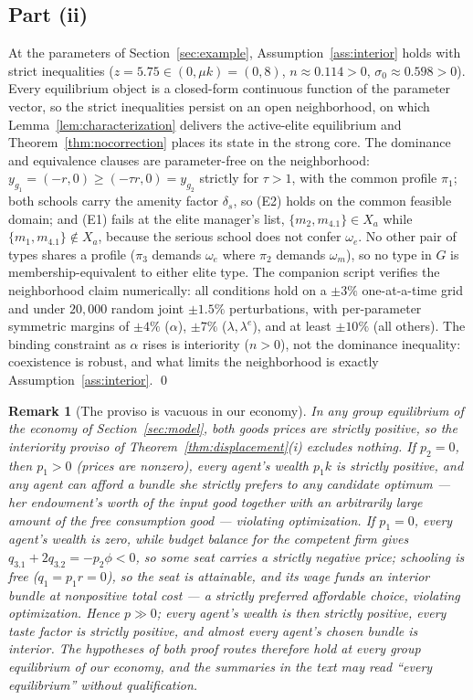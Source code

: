 \documentclass[12pt,letterpaper]{article}
\newtheorem{remark}{Remark}
\theoremstyle{definition}
\begin{document}
\subsection{Part (ii)}
At the parameters of Section~\ref{sec:example}, Assumption~\ref{ass:interior} holds with strict inequalities ($z=5.75\in(0,\mu k)=(0,8)$, $n\approx 0.114>0$, $\sigma_0\approx 0.598>0$).
Every equilibrium object is a closed-form continuous function of the parameter vector, so the strict inequalities persist on an open neighborhood, on which Lemma~\ref{lem:characterization} delivers the active-elite equilibrium and Theorem~\ref{thm:nocorrection} places its state in the strong core.
The dominance and equivalence clauses are parameter-free on the neighborhood: $y_{g_1}=(-r,0)\geq(-\tau r,0)=y_{g_2}$ strictly for $\tau>1$, with the common profile $\pi_1$; both schools carry the amenity factor $\delta_s$, so (E2) holds on the common feasible domain; and (E1) fails at the elite manager's list, $\{m_2,m_{4.1}\}\in X_a$ while $\{m_1,m_{4.1}\}\notin X_a$, because the serious school does not confer $\omega_e$.
No other pair of types shares a profile ($\pi_3$ demands $\omega_e$ where $\pi_2$ demands $\omega_m$), so no type in $G$ is membership-equivalent to either elite type.
The companion script verifies the neighborhood claim numerically: all conditions hold on a $\pm 3\%$ one-at-a-time grid and under $20{,}000$ random joint $\pm 1.5\%$ perturbations, with per-parameter symmetric margins of $\pm 4\%$ ($\alpha$), $\pm 7\%$ ($\lambda,\lambda^{e}$), and at least $\pm 10\%$ (all others).
The binding constraint as $\alpha$ rises is interiority ($n>0$), not the dominance inequality: coexistence is robust, and what limits the neighborhood is exactly Assumption~\ref{ass:interior}.
\qed

\begin{remark}[The proviso is vacuous in our economy]\label{rem:proviso}
In any group equilibrium of the economy of Section~\ref{sec:model}, both goods prices are strictly positive, so the interiority proviso of Theorem~\ref{thm:displacement}(i) excludes nothing.
If $p_2=0$, then $p_1>0$ (prices are nonzero), every agent's wealth $p_1k$ is strictly positive, and any agent can afford a bundle she strictly prefers to any candidate optimum --- her endowment's worth of the input good together with an arbitrarily large amount of the free consumption good --- violating optimization.
If $p_1=0$, every agent's wealth is zero, while budget balance for the competent firm gives $q_{3.1}+2q_{3.2}=-p_2\phi<0$, so some seat carries a strictly negative price; schooling is free ($q_1=p_1r=0$), so the seat is attainable, and its wage funds an interior bundle at nonpositive total cost --- a strictly preferred affordable choice, violating optimization.
Hence $p\gg 0$; every agent's wealth is then strictly positive, every taste factor is strictly positive, and almost every agent's chosen bundle is interior.
The hypotheses of both proof routes therefore hold at every group equilibrium of our economy, and the summaries in the text may read ``every equilibrium'' without qualification.
\end{remark}
\end{document}
